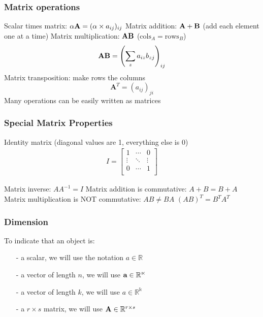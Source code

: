 \documentclass[11pt]{article}
\begin{document}
\begin{flushleft}
\subsubsection{Matrix operations}
Scalar times matrix: $\alpha \textbf A=(\alpha \times a_{ij} )_{ij}$\newline
Matrix addition: $\textbf A + \textbf B $ (add each element one at a time)\newline
Matrix multiplication: $\textbf A \textbf B$ ($\text{cols}_A = \text{rows}_B$)
$$\textbf A \textbf B=\left(\sum_{z} a_{iz} b_{zj}\right)_{ij}$$
Matrix transposition: make rows the columns
$$\textbf{A}^T=(a_{ij} )_{ji}$$
Many operations can be easily written as matrices\newline

\subsubsection{Special Matrix Properties}
Identity matrix (diagonal values are 1, everything else is 0)\newline
\begin{align*}
    I = \begin{bmatrix} 1&\cdots&0\\ \vdots&\ddots&\vdots\\ 0&\cdots&1\\ \end{bmatrix}
\end{align*}

Matrix inverse: $AA^{−1}=I$ \newline
Matrix addition is commutative: $A + B = B + A$ \newline
Matrix multiplication is NOT commutative: $AB \neq BA$
$(AB)^T=B^T A^T$
\newline
\subsubsection{Dimension}
To indicate that an object is: \newline
\begin{itemize}
    \item[-] a scalar, we will use the notation $a \in \mathbb{R}$  
    \item[-] a vector of length $n$, we will use $\textbf a \in \mathbb{R^n}$ 
    \item[-] a vector of length $k$, we will use $a \in \mathbb{R^k}$ 
    \item[-] a $r \times s$ matrix, we will use $\textbf A \in \mathbb{R}^{r \times s}$ 
\end{itemize}


\end{flushleft}
\end{document}
